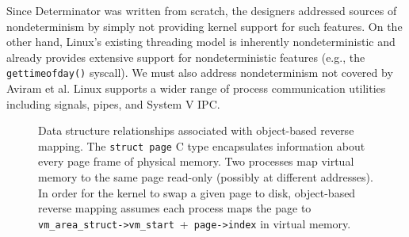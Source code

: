 \begin{itemize}

Since Determinator was
written from scratch, the designers addressed sources of nondeterminism by
simply not providing kernel support for such features. On the other hand,
Linux's existing threading model is inherently nondeterministic and already
provides extensive support for nondeterministic features (e.g., the
{\tt gettimeofday()} syscall). We must also address nondeterminism not covered
by Aviram et al. Linux supports a wider range of process communication utilities
including signals, pipes, and System V IPC.

\begin{figure}[t]
\caption{Data structure relationships associated with object-based reverse
mapping. The {\tt struct page} C type encapsulates information about every
page frame of physical memory.
Two processes map virtual memory to the same page read-only (possibly
at different addresses). In order for the kernel to swap a given page to disk,
object-based reverse mapping assumes each process maps the page to
\mbox{{\tt vm\_area\_struct->vm\_start} + {\tt page->index}} in virtual
memory.}
\label{fig:anon_vma}
\end{figure}


\end{itemize}
